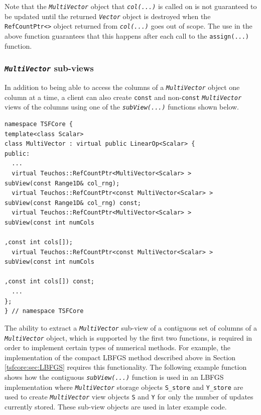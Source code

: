 {}\noindent{}Note that the {}\texttt{\textit{Multi\-Vector}} object
that {}\texttt{\textit{col(...)}} is called on is not guaranteed to be
updated until the returned {}\texttt{\textit{Vector}} object is
destroyed when the {}\texttt{RefCountPtr<>} object returned from
{}\texttt{\textit{col(...)}} goes out of scope.  The use in the above
function guarantees that this happens after each call to the
{}\texttt{assign(...)} function.

%
\subsubsection{\texttt{\textit{Multi\-Vector}} sub-views}
%

In addition to being able to access the columns of a
{}\texttt{\textit{Multi\-Vector}} object one column at a time, a client
can also create {}\texttt{const} and non-\texttt{const}
{}\texttt{\textit{Multi\-Vector}} views of the columns
using one of the {}\texttt{\textit{subView(...)}} functions shown below.

{\scriptsize\begin{verbatim}
namespace TSFCore {
template<class Scalar>
class MultiVector : virtual public LinearOp<Scalar> {
public:
  ...
  virtual Teuchos::RefCountPtr<MultiVector<Scalar> >       subView(const Range1D& col_rng);
  virtual Teuchos::RefCountPtr<const MultiVector<Scalar> > subView(const Range1D& col_rng) const;
  virtual Teuchos::RefCountPtr<MultiVector<Scalar> >       subView(const int numCols
                                                                        ,const int cols[]);
  virtual Teuchos::RefCountPtr<const MultiVector<Scalar> > subView(const int numCols
                                                                        ,const int cols[]) const;
  ...
};
} // namespace TSFCore
\end{verbatim}}

{}\noindent{}The ability to extract a
{}\texttt{\textit{Multi\-Vector}} sub-view of a contiguous set of
columns of a {}\texttt{\textit{Multi\-Vector}} object, which is
supported by the first two functions, is required in order to implement
certain types of numerical methods.  For example, the implementation
of the compact LBFGS method described above in Section
{}\ref{tsfcore:sec:LBFGS} requires this functionality.  The following
example function shows how the contiguous
{}\texttt{\textit{subView(...)}} function is used in an LBFGS
implementation where {}\texttt{\textit{Multi\-Vector}} storage objects
{}\texttt{S\_store} and {}\texttt{Y\_store} are used to create
{}\texttt{\textit{Multi\-Vector}} view objects {}\texttt{S} and
{}\texttt{Y} for only the number of updates currently stored.  These
sub-view objects are used in later example code.

